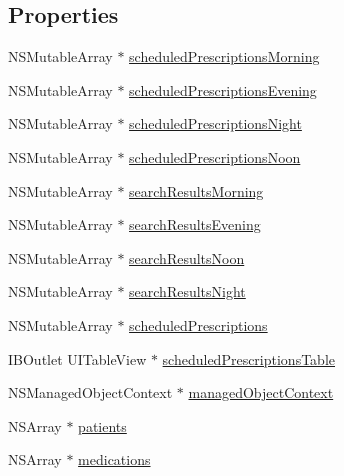 \subsection*{Properties}
\begin{DoxyCompactItemize}
\item 
N\+S\+Mutable\+Array $\ast$ \hyperlink{interface_medikamente_view_controller_a531945833747087c63d15928414a2a8a}{scheduled\+Prescriptions\+Morning}
\item 
N\+S\+Mutable\+Array $\ast$ \hyperlink{interface_medikamente_view_controller_aad65107db3fb20f671871d001f8c8c45}{scheduled\+Prescriptions\+Evening}
\item 
N\+S\+Mutable\+Array $\ast$ \hyperlink{interface_medikamente_view_controller_a620777bcf17df97e9ccf6b5c9ca096a6}{scheduled\+Prescriptions\+Night}
\item 
N\+S\+Mutable\+Array $\ast$ \hyperlink{interface_medikamente_view_controller_a60a2c6da2bc0ca99e75808b327b0c23a}{scheduled\+Prescriptions\+Noon}
\item 
N\+S\+Mutable\+Array $\ast$ \hyperlink{interface_medikamente_view_controller_a8c48c666e67949f34068e8578406fad6}{search\+Results\+Morning}
\item 
N\+S\+Mutable\+Array $\ast$ \hyperlink{interface_medikamente_view_controller_a5a5b31471654f73e8895f88a2d7db3c2}{search\+Results\+Evening}
\item 
N\+S\+Mutable\+Array $\ast$ \hyperlink{interface_medikamente_view_controller_a5ffb2b731a04e9ddbf394fb56694e8df}{search\+Results\+Noon}
\item 
N\+S\+Mutable\+Array $\ast$ \hyperlink{interface_medikamente_view_controller_ad9f3fd6d4a9c491e79f7a2a56d0c40ef}{search\+Results\+Night}
\item 
N\+S\+Mutable\+Array $\ast$ \hyperlink{interface_medikamente_view_controller_a2b4fe7d195e709679ab316daf9420d37}{scheduled\+Prescriptions}
\item 
I\+B\+Outlet U\+I\+Table\+View $\ast$ \hyperlink{interface_medikamente_view_controller_a24ab910681fc6e5c060078334475c45a}{scheduled\+Prescriptions\+Table}
\item 
N\+S\+Managed\+Object\+Context $\ast$ \hyperlink{interface_medikamente_view_controller_a874a8ac0bc923baa5d9067c860745fe3}{managed\+Object\+Context}
\item 
N\+S\+Array $\ast$ \hyperlink{interface_medikamente_view_controller_a236676c098748092c90bb8cbef8cb87e}{patients}
\item 
N\+S\+Array $\ast$ \hyperlink{interface_medikamente_view_controller_a08257deb90eb44d36f8a6405e5233d81}{medications}
\end{DoxyCompactItemize}


